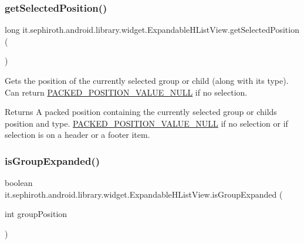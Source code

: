 \subsubsection{\texorpdfstring{get\+Selected\+Position()}{getSelectedPosition()}}
{\footnotesize\ttfamily long it.\+sephiroth.\+android.\+library.\+widget.\+Expandable\+H\+List\+View.\+get\+Selected\+Position (\begin{DoxyParamCaption}{ }\end{DoxyParamCaption})}

Gets the position of the currently selected group or child (along with its type). Can return \hyperlink{classit_1_1sephiroth_1_1android_1_1library_1_1widget_1_1_expandable_h_list_view_a625409dd43a10f9bee03a2fa43d5243a}{P\+A\+C\+K\+E\+D\+\_\+\+P\+O\+S\+I\+T\+I\+O\+N\+\_\+\+V\+A\+L\+U\+E\+\_\+\+N\+U\+LL} if no selection.

\begin{DoxyReturn}{Returns}
A packed position containing the currently selected group or child\textquotesingle{}s position and type. \hyperlink{classit_1_1sephiroth_1_1android_1_1library_1_1widget_1_1_expandable_h_list_view_a625409dd43a10f9bee03a2fa43d5243a}{P\+A\+C\+K\+E\+D\+\_\+\+P\+O\+S\+I\+T\+I\+O\+N\+\_\+\+V\+A\+L\+U\+E\+\_\+\+N\+U\+LL} if no selection or if selection is on a header or a footer item. 
\end{DoxyReturn}
\mbox{\label{classit_1_1sephiroth_1_1android_1_1library_1_1widget_1_1_expandable_h_list_view_a754e1175ea9d84501f49105519c87565}} 
\subsubsection{\texorpdfstring{is\+Group\+Expanded()}{isGroupExpanded()}}
{\footnotesize\ttfamily boolean it.\+sephiroth.\+android.\+library.\+widget.\+Expandable\+H\+List\+View.\+is\+Group\+Expanded (\begin{DoxyParamCaption}\item[{int}]{group\+Position }\end{DoxyParamCaption})}

